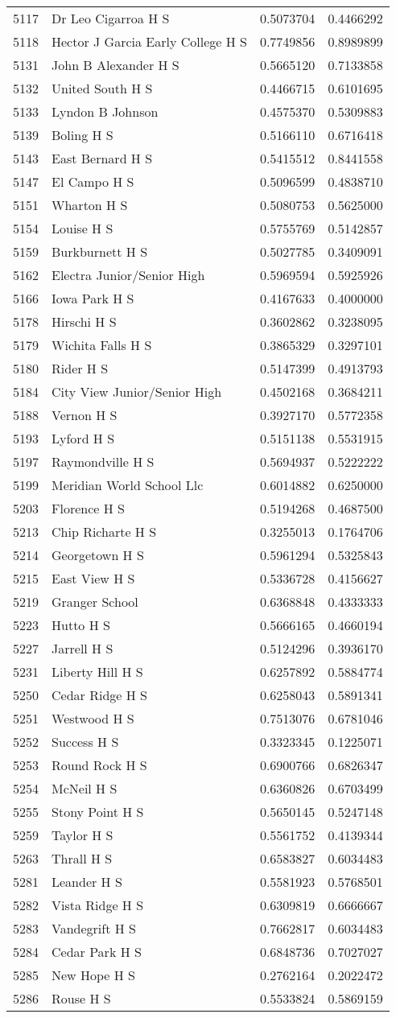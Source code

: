 \documentclass[
]{article}
\begin{document}
\begin{longtable}[]{@{}llrr@{}}
5117 & Dr Leo Cigarroa H S & 0.5073704 & 0.4466292\tabularnewline
5118 & Hector J Garcia Early College H S & 0.7749856 &
0.8989899\tabularnewline
5131 & John B Alexander H S & 0.5665120 & 0.7133858\tabularnewline
5132 & United South H S & 0.4466715 & 0.6101695\tabularnewline
5133 & Lyndon B Johnson & 0.4575370 & 0.5309883\tabularnewline
5139 & Boling H S & 0.5166110 & 0.6716418\tabularnewline
5143 & East Bernard H S & 0.5415512 & 0.8441558\tabularnewline
5147 & El Campo H S & 0.5096599 & 0.4838710\tabularnewline
5151 & Wharton H S & 0.5080753 & 0.5625000\tabularnewline
5154 & Louise H S & 0.5755769 & 0.5142857\tabularnewline
5159 & Burkburnett H S & 0.5027785 & 0.3409091\tabularnewline
5162 & Electra Junior/Senior High & 0.5969594 & 0.5925926\tabularnewline
5166 & Iowa Park H S & 0.4167633 & 0.4000000\tabularnewline
5178 & Hirschi H S & 0.3602862 & 0.3238095\tabularnewline
5179 & Wichita Falls H S & 0.3865329 & 0.3297101\tabularnewline
5180 & Rider H S & 0.5147399 & 0.4913793\tabularnewline
5184 & City View Junior/Senior High & 0.4502168 &
0.3684211\tabularnewline
5188 & Vernon H S & 0.3927170 & 0.5772358\tabularnewline
5193 & Lyford H S & 0.5151138 & 0.5531915\tabularnewline
5197 & Raymondville H S & 0.5694937 & 0.5222222\tabularnewline
5199 & Meridian World School Llc & 0.6014882 & 0.6250000\tabularnewline
5203 & Florence H S & 0.5194268 & 0.4687500\tabularnewline
5213 & Chip Richarte H S & 0.3255013 & 0.1764706\tabularnewline
5214 & Georgetown H S & 0.5961294 & 0.5325843\tabularnewline
5215 & East View H S & 0.5336728 & 0.4156627\tabularnewline
5219 & Granger School & 0.6368848 & 0.4333333\tabularnewline
5223 & Hutto H S & 0.5666165 & 0.4660194\tabularnewline
5227 & Jarrell H S & 0.5124296 & 0.3936170\tabularnewline
5231 & Liberty Hill H S & 0.6257892 & 0.5884774\tabularnewline
5250 & Cedar Ridge H S & 0.6258043 & 0.5891341\tabularnewline
5251 & Westwood H S & 0.7513076 & 0.6781046\tabularnewline
5252 & Success H S & 0.3323345 & 0.1225071\tabularnewline
5253 & Round Rock H S & 0.6900766 & 0.6826347\tabularnewline
5254 & McNeil H S & 0.6360826 & 0.6703499\tabularnewline
5255 & Stony Point H S & 0.5650145 & 0.5247148\tabularnewline
5259 & Taylor H S & 0.5561752 & 0.4139344\tabularnewline
5263 & Thrall H S & 0.6583827 & 0.6034483\tabularnewline
5281 & Leander H S & 0.5581923 & 0.5768501\tabularnewline
5282 & Vista Ridge H S & 0.6309819 & 0.6666667\tabularnewline
5283 & Vandegrift H S & 0.7662817 & 0.6034483\tabularnewline
5284 & Cedar Park H S & 0.6848736 & 0.7027027\tabularnewline
5285 & New Hope H S & 0.2762164 & 0.2022472\tabularnewline
5286 & Rouse H S & 0.5533824 & 0.5869159\tabularnewline

\end{longtable}
\end{document}
